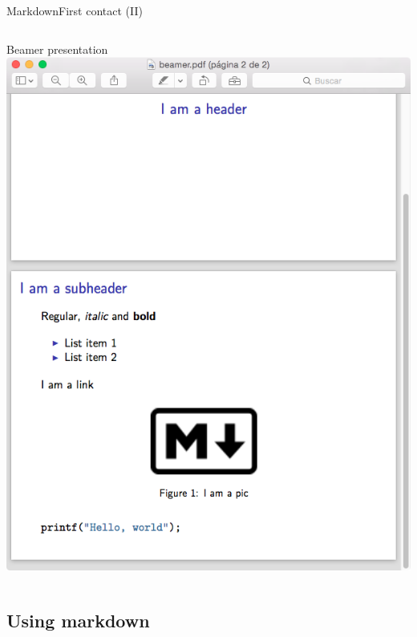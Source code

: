 \documentclass{beamer}
\begin{document}
\begin{frame}[plain]{Markdown}{First contact (II)}
\begin{columns}
     \column{0.3\dimexpr\paperwidth-10pt}
	 	\centering Beamer presentation \\
		\includegraphics[height=\linewidth]{figs/beamer.png} 
\end{columns}

\end{frame}


\subsection{Using markdown}

\end{document}
